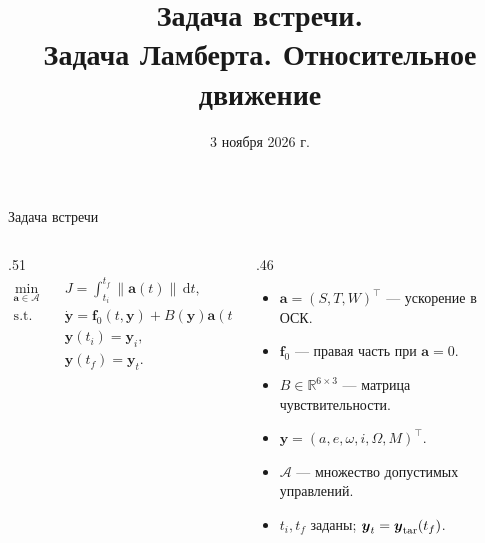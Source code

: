 \documentclass[11pt,aspectratio=169,t]{beamer}
\title{Задача встречи.\\Задача Ламберта. Относительное движение}
\date{3 ноября 2026 г.}
\newcommand{\eqcompact}{\fontsize{10}{12}\selectfont}
\newcommand{\derivationmathspacing}{%
  \setlength{\abovedisplayskip}{2pt}%
  \setlength{\belowdisplayskip}{3pt}%
  \setlength{\abovedisplayshortskip}{2pt}%
  \setlength{\belowdisplayshortskip}{2pt}%
  \setlength{\jot}{2pt}}
\newcommand{\vect}[1]{\boldsymbol{#1}}
\begin{document}
\begin{frame}[plain]\titlepage\end{frame}

\begin{frame}{Задача встречи}
\relax
\derivationmathspacing
\begin{columns}[T,onlytextwidth]
\begin{column}{.51\textwidth}
{\eqcompact
\[
\begin{aligned}
 \min_{\vect a\in\mathcal A}\quad
       &J=\int_{t_i}^{t_f}\lVert\vect a(t)\rVert\,\mathrm dt,\\[7pt]
 \mathrm{s.t.}\quad
       &\dot{\vect y}=\vect f_0(t,\vect y)+B(\vect y)\vect a(t),\\[7pt]
 &\vect y(t_i)=\vect y_i,\\[4pt]
 &\vect y(t_f)=\vect y_t.
\end{aligned}
\]
}
\end{column}
\begin{column}{.46\textwidth}
\begin{itemize}
\setlength{\itemsep}{3pt}
 \item $\vect a=(S,T,W)^\top$ --- ускорение в ОСК.
 \item $\vect f_0$ --- правая часть при $\vect a=0$.
 \item $B\in\mathbb R^{6\times3}$ --- матрица чувствительности.
 \item $\vect y=(a,e,\omega,i,\Omega,M)^\top$.
 \item $\mathcal A$ --- множество допустимых управлений.
 \item $t_i,t_f$ заданы; $\vect y_t=\vect y_{\rm tar}(t_f)$.
\end{itemize}
\end{column}
\end{columns}
\end{frame}
\end{document}
